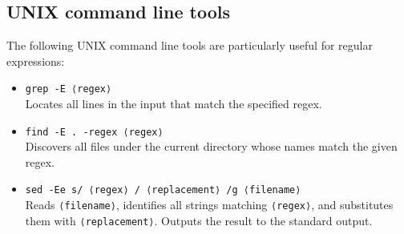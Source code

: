 \subsection{UNIX command line tools}
The following UNIX command line tools are particularly useful for regular expressions:
\begin{itemize}
    \item \texttt{grep -E ⟨regex⟩} \\
        Locates all lines in the input that match the specified regex.
    \item \texttt{find -E . -regex ⟨regex⟩} \\
        Discovers all files under the current directory whose names match the given regex.
    \item \texttt{sed -Ee s/ ⟨regex⟩ / ⟨replacement⟩ /g ⟨filename⟩} \\
        Reads \texttt{⟨filename⟩}, identifies all strings matching \texttt{⟨regex⟩}, and substitutes them with \texttt{⟨replacement⟩}. 
        Outputs the result to the standard output.
\end{itemize}